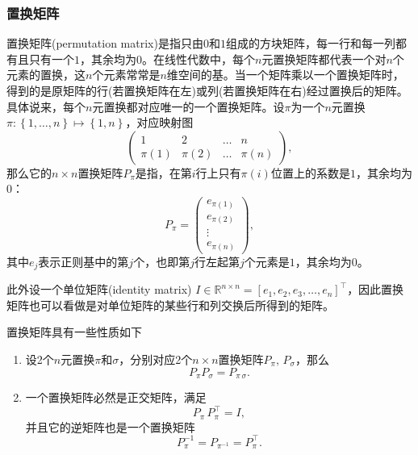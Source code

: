 \subsubsection{置换矩阵}
\label{sec:numlin-matrix-permutation}
置换矩阵(permutation matrix)是指只由$0$和$1$组成的方块矩阵，每一行和每一列都有且只有一个$1$，其余均为$0$。在线性代数中，每个$n$元置换矩阵都代表一个对$n$个元素的置换，这$n$个元素常常是$n$维空间的基。当一个矩阵乘以一个置换矩阵时，得到的是原矩阵的行(若置换矩阵在左)或列(若置换矩阵在右)经过置换后的矩阵。具体说来，每个$n$元置换都对应唯一的一个置换矩阵。设$\pi$为一个$n$元置换$\pi: \left\{ 1,\ldots,n \right\} \mapsto \left\{ 1, n \right\}$，对应映射图
\begin{equation*}
  \begin{pmatrix}
    1 & 2 & \ldots & n \\
    \pi(1) & \pi(2) & \ldots & \pi(n)
  \end{pmatrix},
\end{equation*}
那么它的$n \times n$置换矩阵$P_{\pi}$是指，在第$i$行上只有$\pi(i)$位置上的系数是$1$，其余均为$0$：
\begin{equation}
  \label{eq:numlin-matrix-permutation}
  P_{\pi} = \begin{pmatrix}
  e_{\pi(1)} \\e_{\pi(2)} \\ \vdots \\ e_{\pi(n)}
  \end{pmatrix},
\end{equation}
其中$e_{j}$表示正则基中的第$j$个，也即第$j$行左起第$j$个元素是$1$，其余均为$0$。

此外设一个单位矩阵(identity matrix) $I \in \mathbb{R}^{n \times n} = \left[ e_{1}, e_{2}, e_{3}, \ldots, e_{n} \right]^{\top}$，因此置换矩阵也可以看做是对单位矩阵的某些行和列交换后所得到的矩阵。

置换矩阵具有一些性质如下
\begin{enumerate}
  \item 设2个$n$元置换$\pi$和$\sigma$，分别对应2个$n \times n$置换矩阵$P_{\pi}, \, P_{\sigma}$，那么
  \begin{equation*}
    P_{\pi} P_{\sigma} = P_{\pi \, \sigma}.
  \end{equation*}
  \item 一个置换矩阵必然是正交矩阵，满足
  \begin{equation*}
    P_{\pi} \, P_{\pi}^{\top} = I,
  \end{equation*}
  并且它的逆矩阵也是一个置换矩阵
  \begin{equation*}
    P_{\pi}^{-1} = P_{\pi^{-1}} = P_{\pi}^{\top}.
  \end{equation*}
\end{enumerate}

